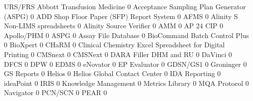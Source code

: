 \documentclass{article}
\begin{document}
\begin{Schunk}
\begin{Soutput}
                                                            URS/FRS
  Abbott Transfusion Medicine                                     0
  Acceptance Sampling Plan Generator (ASPG)                       0
  ADD Shop Floor Paper (SFP) Report System                        0
  AFMS                                                            0
  Alinity S Non-LIMS spreadsheets                                 0
  Alinity Source Verifier                                         0
  AMM                                                             0
  AP 24 CIP                                                       0
  Apollo/PHM                                                      0
  ASPG                                                            0
  Assay File Database                                             0
  BioCommand Batch Control Plus                                   0
  BioXpert                                                        0
  CHaRM                                                           0
  Clinical Chemistry Excel Spreadsheet for Digital Printing       0
  CMSnext                                                         0
  CMSNext                                                         0
  DARA Filler DHM and RU                                          0
  DaVinci                                                         0
  DFCS                                                            0
  DPW                                                             0
  EDMS                                                            0
  eNovator                                                        0
  EP Evaluator                                                    0
  GDSN/GS1                                                        0
  Groninger                                                       0
  GS Reports                                                      0
  Helios                                                          0
  Helios Global Contact Center                                    0
  IDA Reporting                                                   0
  ideaPoint                                                       0
  IRIS                                                            0
  Knowledge Management                                            0
  Metrics Library                                                 0
  MQA Protocol                                                    0
  Navigator                                                       0
  PCN/SCN                                                         0
  PEAR                                                            0

\end{Soutput}
\end{Schunk}
\end{document}
